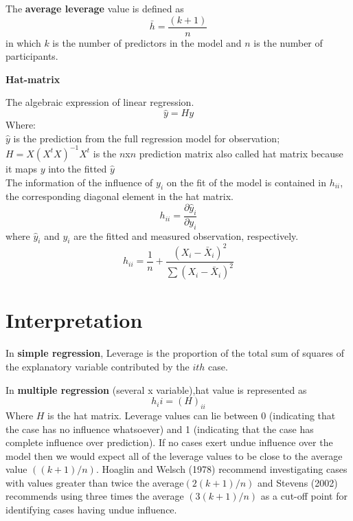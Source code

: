 \documentclass{article}[20pt]
\begin{document}
The {\bf average leverage} value is defined as $$\bar{h}=\frac{(k+1)}{n}$$ in which $k$ is the number of predictors in the model and $n$ is the number of participants.

{\bf Hat-matrix}  

\bigskip
The algebraic expression of linear regression.
$$\hat{y} = Hy$$
Where:\\
$\hat{y}$ is the prediction from the full regression model for observation; \\
$H = X(X^tX)^{-1}X^t$ is the $n$x$n$  prediction matrix also called hat matrix because it maps $y$ into the fitted $\hat{y}$\\
The information of the influence of $y_i$ on the fit of the model is contained in $h_{ii}$, the corresponding diagonal element in the hat matrix.\\ 

$$ h_{ii} = \frac{\partial{\hat{y}_i}}{\partial y_i}$$
where $\hat{y}_i$ and ${y}_i$ are the fitted and measured observation, respectively.
$$ h_{ii} =\frac{1}{n} + \frac{(X_i - \bar{X}_i)^2 }{\sum(X_i - \bar{X}_i)^2}$$

\section{Interpretation }

In {\bf simple regression}, Leverage is the proportion of the total sum of squares of the explanatory variable contributed by the $ith$ case.

In{ \bf multiple regression} (several x variable),hat value is represented as $$h_ii = (H)_{ii}$$
Where $H$ is the hat matrix.
\bigskip
Leverage values can lie between 0 (indicating that the case has no influence whatsoever) and 1 (indicating that the case has complete influence over prediction). If no cases exert undue influence over the model then we would expect all of the leverage values to be close to the average value $((k + 1)/n)$. Hoaglin and Welsch (1978) recommend investigating cases with values greater than twice the average$ (2(k + 1)/n)$ and Stevens (2002) recommends using three times the average $(3(k + 1)/n)$ as a cut-off point for identifying cases having undue influence.\citep{DSUR}
\end{document}
